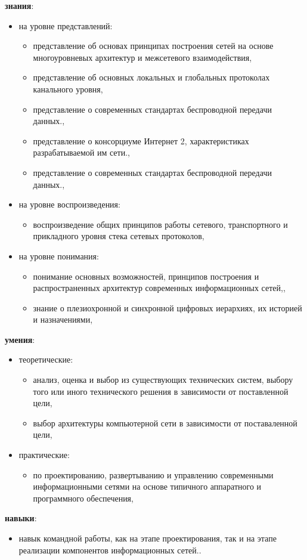 \begin{center}
{\parindent0pt
\textbf{знания}:
\begin{itemize}
\item на уровне представлений:
\begin{itemize}
\item представление об основах принципах построения сетей на основе многоуровневых архитектур и межсетевого взаимодействия,\item представление об основных локальных и глобальных протоколах канального уровня,\item представление о современных стандартах беспроводной передачи данных.,\item представление о консорциуме Интернет 2, характеристиках разрабатываемой им сети.,\item представление о современных стандартах беспроводной передачи данных.,
\end{itemize}
\item на уровне воспроизведения:
\begin{itemize}
\item воспроизведение общих принципов работы сетевого, транспортного и прикладного уровня стека сетевых протоколов,
\end{itemize}
\item на уровне понимания:
\begin{itemize}
\item понимание основных возможностей, принципов построения и распространенных архитектур современных информационных сетей,,\item знание о плезиохронной и синхронной цифровых иерархиях, их историей и назначениями,
\end{itemize}
\end{itemize}
\textbf{умения}:
\begin{itemize}
\item теоретические:
\begin{itemize}
\item анализ, оценка и выбор из существующих технических систем, выбору того или иного технического решения в зависимости от поставленной цели,\item выбор архитектуры компьютерной сети в зависимости от поставаленной цели,
\end{itemize}
\item практические:
\begin{itemize}
\item по проектированию, развертыванию и управлению современными информационными сетями на основе типичного аппаратного и программного обеспечения,
\end{itemize}
\end{itemize}
\textbf{навыки}:
\begin{itemize}
\item навык командной работы, как на этапе проектирования, так и на этапе реализации компонентов информационных сетей..
\end{itemize}

}
\end{center}
